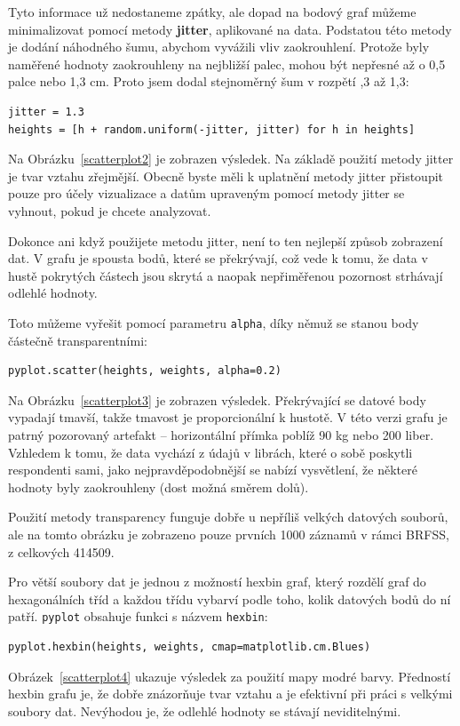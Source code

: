 \documentclass[12pt]{book}
\begin{document}
Tyto informace už nedostaneme zpátky, ale dopad na bodový graf můžeme minimalizovat pomocí metody {\bf jitter}, aplikované na data. Podstatou této metody je dodání náhodného šumu, abychom vyvážili vliv zaokrouhlení.  Protože byly naměřené hodnoty zaokrouhleny na nejbližší palec, mohou být nepřesné až o 0,5 palce nebo 1,3 cm. Proto jsem dodal stejnoměrný šum v rozpětí ,3 až 1,3:
%
\begin{verbatim}
jitter = 1.3
heights = [h + random.uniform(-jitter, jitter) for h in heights]
\end{verbatim}

Na Obrázku~\ref{scatterplot2} je zobrazen výsledek. Na základě použití metody jitter je tvar vztahu zřejmější. Obecně byste měli k uplatnění metody jitter přistoupit pouze pro účely vizualizace a datům upraveným pomocí metody jitter se vyhnout, pokud je chcete analyzovat.

Dokonce ani když použijete metodu jitter, není to ten nejlepší způsob zobrazení dat. V grafu je spousta bodů, které se překrývají, což vede k tomu, že data v hustě pokrytých částech jsou skrytá a naopak nepřiměřenou pozornost strhávají odlehlé hodnoty.

Toto můžeme vyřešit pomocí parametru {\tt alpha}, díky němuž se stanou body částečně transparentními:
%
\begin{verbatim}
pyplot.scatter(heights, weights, alpha=0.2)
\end{verbatim}
%
Na Obrázku~\ref{scatterplot3} je zobrazen výsledek.  Překrývající se datové body vypadají tmavší, takže tmavost je proporcionální k hustotě. V této verzi grafu je patrný pozorovaný artefakt -- horizontální přímka poblíž 90 kg nebo 200 liber. Vzhledem k tomu, že data vychází z údajů v librách, které o sobě poskytli respondenti sami, jako nejpravděpodobnější se nabízí vysvětlení, že některé hodnoty byly zaokrouhleny (dost možná směrem dolů).

Použití metody transparency funguje dobře u nepříliš velkých datových souborů, ale na tomto obrázku je zobrazeno pouze prvních 1000 záznamů v rámci BRFSS, z celkových 414509.

Pro větší soubory dat je jednou z možností hexbin graf, který rozdělí graf do hexagonálních tříd a každou třídu vybarví podle toho, kolik datových bodů do ní patří. {\tt pyplot} obsahuje funkci s názvem {\tt hexbin}:
%
\begin{verbatim}
pyplot.hexbin(heights, weights, cmap=matplotlib.cm.Blues)
\end{verbatim}
%
Obrázek~\ref{scatterplot4} ukazuje výsledek za použití mapy modré barvy.
Předností hexbin grafu je, že dobře znázorňuje tvar vztahu a je efektivní při práci s velkými soubory dat. Nevýhodou je, že odlehlé hodnoty se stávají neviditelnými.
\end{document}
